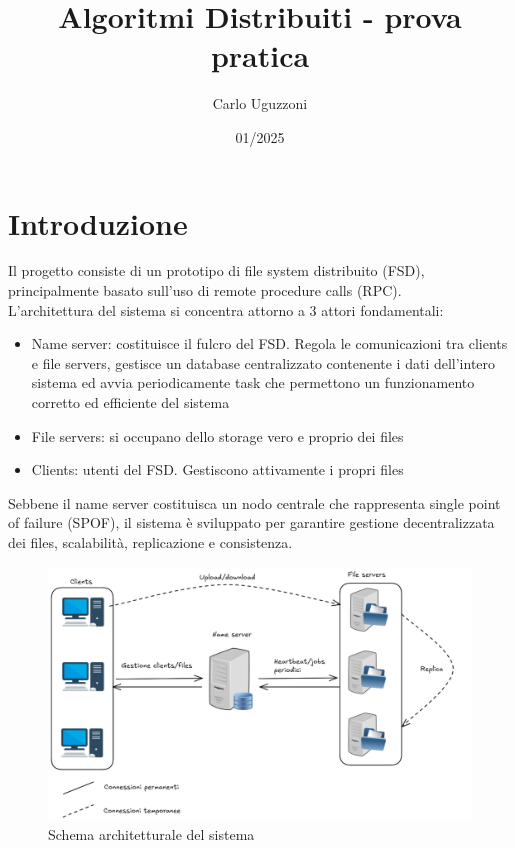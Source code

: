 \documentclass[a4paper, 12pt]{scrreprt}
\begin{document}
    \title{Algoritmi Distribuiti - prova pratica}
    \date{01/2025}
    \author{Carlo Uguzzoni}

    \maketitle

    \tableofcontents
    \thispagestyle{empty}

    \newpage
    \setcounter{page}{1}


    \chapter{Introduzione}

        Il progetto consiste di un prototipo di file system distribuito (FSD), principalmente basato sull'uso di remote procedure calls (RPC).\\
        L'architettura del sistema si concentra attorno a 3 attori fondamentali:

        \begin{itemize}

            \item Name server: costituisce il fulcro del FSD. Regola le comunicazioni tra clients e file servers, gestisce un database centralizzato contenente i dati dell'intero sistema ed avvia periodicamente task che permettono un funzionamento corretto ed efficiente del sistema

            \item File servers: si occupano dello storage vero e proprio dei files

            \item Clients: utenti del FSD. Gestiscono attivamente i propri files

        \end{itemize}

        Sebbene il name server costituisca un nodo centrale che rappresenta single point of failure (SPOF), il sistema è sviluppato per garantire gestione decentralizzata dei files, scalabilità, replicazione e consistenza.

        \begin{figure}[H]
            \centering
            \includegraphics[width = .6 \textwidth]{img/architettura.png}
            \caption{Schema architetturale del sistema}
        \end{figure}
\end{document}
